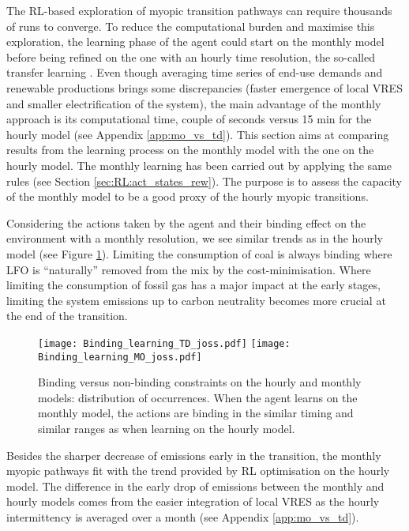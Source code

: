 The \acrfull{RL}-based exploration of myopic transition pathways can require thousands of runs to converge. To reduce the computational burden and maximise this exploration, the learning phase of the agent could start on the monthly model before being refined on the one with an hourly time resolution, the so-called transfer learning \cite{mann2013directed}.  Even though averaging time series of end-use demands and renewable productions brings some discrepancies (\ie faster emergence of local VRES and smaller electrification of the system), the main advantage of the monthly approach is its computational time, \ie couple of seconds versus 15 min for the hourly model (see Appendix \ref{app:mo_vs_td}). This section aims at comparing results from the learning process on the monthly model with the one on the hourly model. The monthly learning has been carried out by applying the same rules (see Section \ref{sec:RL:act_states_rew}). The purpose is to assess the capacity of the monthly model to be a good proxy of the hourly myopic transitions.

Considering the actions taken by the agent and their binding effect on the environment with a monthly resolution,  we see similar trends as in the hourly model (see Figure \ref{fig:app:Binding_constr_joss}). Limiting the consumption of coal is always binding where \gls{LFO} is ``naturally'' removed from the mix by the cost-minimisation. Where limiting the consumption of fossil gas has a major impact at the early stages, limiting the system emissions up to carbon neutrality becomes more crucial at the end of the transition.

\begin{figure}[!htbp]
\centering
\texttt{[image: Binding\_learning\_TD\_joss.pdf]}
\texttt{[image: Binding\_learning\_MO\_joss.pdf]}
\caption{Binding versus non-binding constraints on the hourly and monthly models: distribution of occurrences. When the agent learns on the monthly model, the actions are binding in the similar timing and similar ranges as when learning on the hourly model. }
\label{fig:app:Binding_constr_joss}
\end{figure} 

Besides the sharper decrease of emissions early in the transition, the monthly myopic pathways fit with the trend provided by \gls{RL} optimisation on the hourly model. The difference in the early drop of emissions between the monthly and hourly models comes from the easier integration of local \gls{VRES} as the hourly intermittency is averaged over a month (see Appendix \ref{app:mo_vs_td}). 

